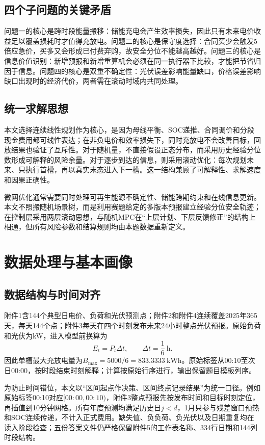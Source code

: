 \documentclass[UTF8,12pt,a4paper]{ctexart}
\theoremstyle{remark}
\begin{document}
\subsection{四个子问题的关键矛盾}
问题一的核心是跨时段能量搬移：储能充电会产生效率损失，因此只有未来电价收益足以覆盖损耗时才值得充放电。问题二的核心是保守度选择：合同买少会触发5倍应急价，买多又会形成已付费弃购，故安全分位不能越高越好。问题三的核心是信息价值识别：新增预报和新增重算机会必须在同一执行器下比较，才能把节省归因于信息。问题四的核心是双重不确定性：光伏误差影响能量缺口，价格误差影响缺口出现时的经济代价，两者需在滚动时域内共同处理。

\subsection{统一求解思想}
本文选择连续线性规划作为核心，是因为母线平衡、SOC递推、合同调价和分段现金费用都可线性表达；在非负电价和效率损失下，同时充放电不会改善目标，回放结果也验证了互斥性。对于随机量，不直接假设正态分布，而采用历史经验分位数形成可解释的风险余量。对于逐步到达的信息，则采用滚动优化：每次规划未来、只执行首槽，再以真实末态进入下一槽。这一结构兼顾了可解释性、求解速度和因果正确性。

微网优化通常需要同时处理可再生能源不确定性、储能跨期约束和在线信息更新\cite{alonso2022uncertainty}。本文不照搬随机场景树，而是利用赛题给定的多版本预报建立经验分位安全轨迹；在控制层采用两层滚动思想，与随机MPC在“上层计划、下层反馈修正”的结构上相通\cite{cominesi2018two}，但所有风险参数和结算规则均由本题数据重新定义。

\section{数据处理与基本画像}
\subsection{数据结构与时间对齐}
附件1含144个典型日电价、负荷和光伏预测点；附件2和附件4连续覆盖2025年365天，每天144个点；附件3每天在四个时刻发布未来24小时整点光伏预报。原始负荷和光伏为kW，进入模型前换算为
\begin{equation}E_t=P_t\Delta t,\qquad \Delta t=\frac{1}{6}\ \mathrm{h}.\label{eq:power-energy}\end{equation}
因此单槽最大充放电量为$B_{\max}=5000/6=833.3333\ \mathrm{kWh}$。原始标签从00:10至次日00:00，按时段结束时刻解释；计算按原始行序进行，输出保留题目模板列序。

为防止时间错位，本文以“区间起点作决策、区间终点记录结果”为统一口径。例如原始标签00:10对应$[00{:}00,00{:}10)$，附件3整点预报先按发布时间和目标时刻定位，再插值到10分钟网格。所有年度预测均满足历史日$j<d$，1月只参与残差窗口预热和SOC连续传递，不计入正式费用。缺失值、负负荷、负光伏以及日期重复均在读入阶段检查；五份答案文件仍严格保留附件5的工作表名称、334行日期和144列时段结构。
\end{document}
